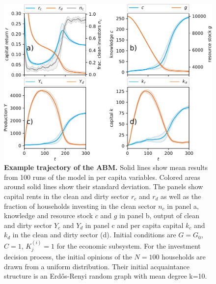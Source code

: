 \begin{figure}[H]
  \hspace{-.8 cm}\includegraphics[width=1.1\linewidth]{figures/example_trajectory_square_thesis.pdf}
  \caption[Example trajectory of the agent-based model]{\textbf{Example trajectory of the ABM.} Solid lines show mean results from 100 runs of the model in per capita variables. Colored areas around solid lines show their standard deviation. The panels show capital rents in the clean and dirty sector $r_c$ and $r_d$ as well as the fraction of households investing in the clean sector $n_c$ in panel a, knowledge and resource stock $c$ and $g$ in panel b, output of clean and dirty sector $Y_c$ and $Y_d$ in panel c and per capita capital $k_c$ and $k_d$ in the clean and dirty sector (d).
Initial conditions are $G=G_0$, $C=1$, $K_j^{(i)}=1$ for the economic subsystem. For the investment decision process, the initial opinions of the $N=100$ households are drawn from a uniform distribution. Their initial acquaintance structure is an Erd\H{o}s-Renyi random graph with mean degree k=10.}
\label{fig:example_trajectory}
\end{figure}

